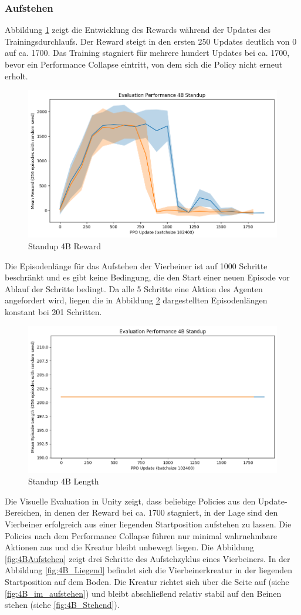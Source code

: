 \subsubsection{Aufstehen}
Abbildung \ref{fig:Standup4B_Reward} zeigt die Entwicklung des Rewards während der Updates des Trainingsdurchlaufs. Der Reward steigt in den ersten 250 Updates deutlich von 0 auf ca. 1700. Das Training stagniert für mehrere hundert Updates bei ca. 1700, bevor ein Performance Collapse eintritt, von dem sich die Policy nicht erneut erholt.

\begin{figure}[ht]
    \centering
    \includegraphics[width=0.5\linewidth]{resources/img/results/Standup4B_Reward.png}
    \caption{Standup 4B Reward}\label{fig:Standup4B_Reward}
\end{figure}

Die Episodenlänge für das Aufstehen der Vierbeiner ist auf 1000 Schritte beschränkt und es gibt keine Bedingung, die den Start einer neuen Episode vor Ablauf der Schritte bedingt. Da alle 5 Schritte eine Aktion des Agenten angefordert wird, liegen die in Abbildung \ref{fig:Standup4B_Length} dargestellten Episodenlängen konstant bei 201 Schritten.

\begin{figure}[ht]
    \centering
    \includegraphics[width=0.5\linewidth]{resources/img/results/Standup4B_Length.png}
    \caption{Standup 4B Length}\label{fig:Standup4B_Length}
\end{figure}

Die Visuelle Evaluation in Unity zeigt, dass beliebige Policies aus den Update-Bereichen, in denen der Reward bei ca. 1700 stagniert, in der Lage sind den Vierbeiner erfolgreich aus einer liegenden Startposition aufstehen zu lassen. Die Policies nach dem Performance Collapse führen nur minimal wahrnehmbare Aktionen aus und die Kreatur bleibt unbewegt liegen.\newline
Die Abbildung \ref{fig:4BAufstehen} zeigt drei Schritte des Aufstehzyklus eines Vierbeiners. In der Abbildung \ref{fig:4B_Liegend} befindet sich die Vierbeinerkreatur in der liegenden Startposition auf dem Boden. Die Kreatur richtet sich über die Seite auf (siehe \ref{fig:4B_im_aufstehen}) und bleibt abschließend relativ stabil auf den Beinen stehen (siehe \ref{fig:4B_Stehend}).

